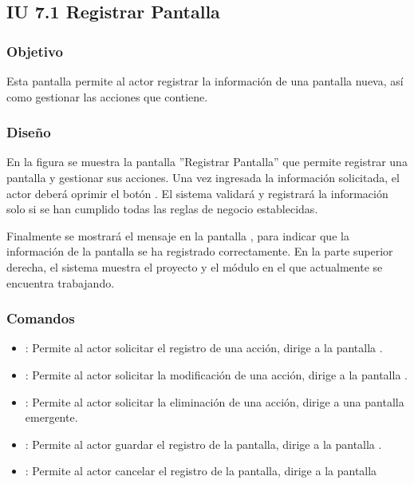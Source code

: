 \subsection{IU 7.1 Registrar Pantalla}

\subsubsection{Objetivo}
	Esta pantalla permite al actor registrar la información de una pantalla nueva, así como gestionar las acciones que contiene.
\subsubsection{Diseño}
	En la figura  se muestra la pantalla ''Registrar Pantalla'' que permite registrar una pantalla y gestionar sus acciones.
	Una vez ingresada la información solicitada, el actor deberá oprimir el botón  . El sistema validará y registrará la información solo si se han cumplido todas las reglas de negocio establecidas.
	
	Finalmente se mostrará el mensaje  en la pantalla , para indicar que la información de la pantalla se ha registrado correctamente.
	En la parte superior derecha, el sistema muestra el proyecto y el módulo en el que actualmente se encuentra trabajando.

\subsubsection{Comandos}
\begin{itemize}
	\item {}: Permite al actor solicitar el registro de una acción, dirige a la pantalla .
	\item \editar [Modificar]: Permite al actor solicitar la modificación de una acción, dirige a la pantalla .
	\item \eliminar [Eliminar]: Permite al actor solicitar la eliminación de una acción, dirige a una pantalla emergente.
	\item {}: Permite al actor guardar el registro de la pantalla, dirige a la pantalla .
	\item {}: Permite al actor cancelar el registro de la pantalla, dirige a la pantalla 
\end{itemize}

